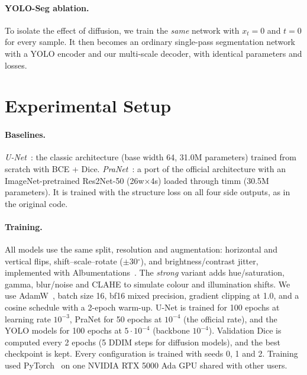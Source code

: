 \documentclass[10pt,twocolumn,letterpaper]{article}
\begin{document}
\paragraph{YOLO-Seg ablation.} To isolate the effect of diffusion, we train the \emph{same} network with $x_t=0$ and $t=0$ for every sample. It then becomes an ordinary single-pass segmentation network with a YOLO encoder and our multi-scale decoder, with identical parameters and losses.

\section{Experimental Setup}
\label{sec:setup}

\paragraph{Baselines.} \emph{U-Net}~\cite{ronneberger2015unet}: the classic architecture (base width 64, 31.0M parameters) trained from scratch with BCE + Dice. \emph{PraNet}~\cite{fan2020pranet}: a port of the official architecture with an ImageNet-pretrained Res2Net-50 (26w$\times$4s) loaded through timm (30.5M parameters). It is trained with the structure loss on all four side outputs, as in the original code.

\paragraph{Training.} All models use the same split, resolution and augmentation: horizontal and vertical flips, shift--scale--rotate ($\pm$30$^\circ$), and brightness/contrast jitter, implemented with Albumentations~\cite{buslaev2020albumentations}. The \emph{strong} variant adds hue/saturation, gamma, blur/noise and CLAHE to simulate colour and illumination shifts. We use AdamW~\cite{loshchilov2019adamw}, batch size 16, bf16 mixed precision, gradient clipping at 1.0, and a cosine schedule with a 2-epoch warm-up. U-Net is trained for 100 epochs at learning rate $10^{-3}$, PraNet for 50 epochs at $10^{-4}$ (the official rate), and the YOLO models for 100 epochs at $5\cdot10^{-4}$ (backbone $10^{-4}$). Validation Dice is computed every 2 epochs (5 DDIM steps for diffusion models), and the best checkpoint is kept. Every configuration is trained with seeds 0, 1 and 2. Training used PyTorch~\cite{paszke2019pytorch} on one NVIDIA RTX 5000 Ada GPU shared with other users.
\end{document}
